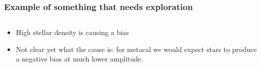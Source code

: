 \documentclass{beamer}
\begin{document}
\frame
{


    \frametitle{Example of something that needs exploration}


    \begin{columns}
        \begin{column}{0.5\textwidth}
        \begin{itemize}

            \item High stellar density is causing a bias

            \item Not clear yet what the cause is: for metacal we would
                expect stars to produce a negative bias at much
                lower amplitude.

        \end{itemize}
        \end{column}
        \begin{column}{0.5\textwidth}
            \begin{center}
                \texttt{[image: \{m-vs-density.png]}}
            \end{center}
            
        \end{column}
    \end{columns}


}
\end{document}
